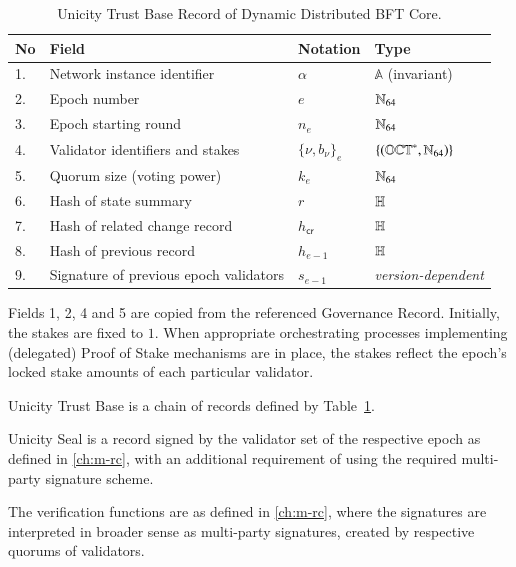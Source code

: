 \begin{table}[!htbp]
	\begin{center}
		\caption{Unicity Trust Base Record of Dynamic Distributed BFT Core.}\label{ta:t-drc}
		\begin{tabular}{|p{0.5cm}|p{8cm}|p{1.7cm}|p{3.5cm}|}\hline
			No & Field                           & Notation       & Type                       \\\hline\hline
			1. & Network instance identifier     & $\alpha$       & $\mathbb{A}$ (invariant)   \\\hline
			2. & Epoch number                    & $e$            & $\mathbb{N}_{64}$                \\\hline
			3. & Epoch starting round            & $n_e$          & $\mathbb{N}_{64}$                \\\hline
			4. & Validator identifiers and stakes& $\{\nu, b_\nu\}_e$& $\{ (\mathbb{OCT}^{\ast}, \mathbb{N}_{64}) \}$\\\hline
			5. & Quorum size (voting power)      & $k_e$          & $\mathbb{N}_{64}$                \\\hline
			6. & Hash of state summary           & $r$            &  $\mathbb{H}$              \\\hline
			7. & Hash of related change record   & $h_{\mathsf{cr}}$& $\mathbb{H}$             \\\hline
			8. & Hash of previous record         & $h_{e-1}$      & $\mathbb{H}$               \\\hline
			9. & Signature of previous epoch validators & $s_{e-1}$& \textit{version-dependent}\\\hline
		\end{tabular}
	\end{center}
\end{table}

Fields 1, 2, 4 and 5 are copied from the referenced Governance Record. Initially, the stakes are fixed to $1$. When appropriate orchestrating processes implementing (delegated) Proof of Stake mechanisms are in place, the stakes reflect the epoch's locked stake amounts of each particular validator.

Unicity Trust Base is a chain of records defined by Table~\ref{ta:t-drc}.

Unicity Seal is a record signed by the validator set of the respective epoch as defined in \ref{ch:m-rc}, with an additional requirement of using the required multi-party signature scheme.

The verification functions are as defined in \ref{ch:m-rc}, where the signatures are interpreted in broader sense as multi-party signatures, created by respective quorums of validators.


